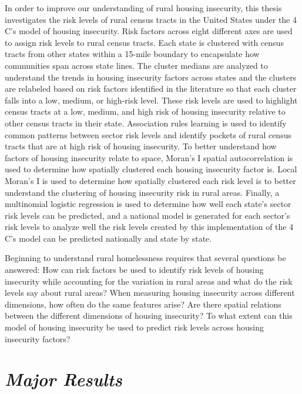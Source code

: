 In order to improve our understanding of rural housing insecurity, this thesis investigates the risk levels of rural census tracts in the United States under the 4 C's model of housing insecurity. Risk factors across eight different axes are used to assign risk levels to rural census tracts. Each state is clustered with census tracts from other states within a 15-mile boundary to encapsulate how communities span across state lines. The cluster medians are analyzed to understand the trends in housing insecurity factors across states and the clusters are relabeled based on risk factors identified in the literature so that each cluster falls into a low, medium, or high-risk level. These risk levels are used to highlight census tracts at a low, medium, and high risk of housing insecurity relative to other census tracts in their state. Association rules learning is used to identify common patterns between sector risk levels and identify pockets of rural census tracts that are at high risk of housing insecurity. To better understand how factors of housing insecurity relate to space, Moran's I spatial autocorrelation is used to determine how spatially clustered each housing insecurity factor is. Local Moran's I is used to determine how spatially clustered each risk level is to better understand the clustering of housing insecurity risk in rural areas. Finally, a multinomial logistic regression is used to determine how well each state's sector risk levels can be predicted, and a national model is generated for each sector's risk levels to analyze well the risk levels created by this implementation of the 4 C's model can be predicted nationally and state by state. 

Beginning to understand rural homelessness requires that several questions be answered: How can risk factors be used to identify risk levels of housing insecurity while accounting for the variation in rural areas and what do the risk levels say about rural areas? When measuring housing insecurity across different dimensions, how often do the same features arise? Are there spatial relations between the different dimensions of housing insecurity? To what extent can this model of housing insecurity be used to predict risk levels across housing insecurity factors?

\section{\textit{Major Results}}


